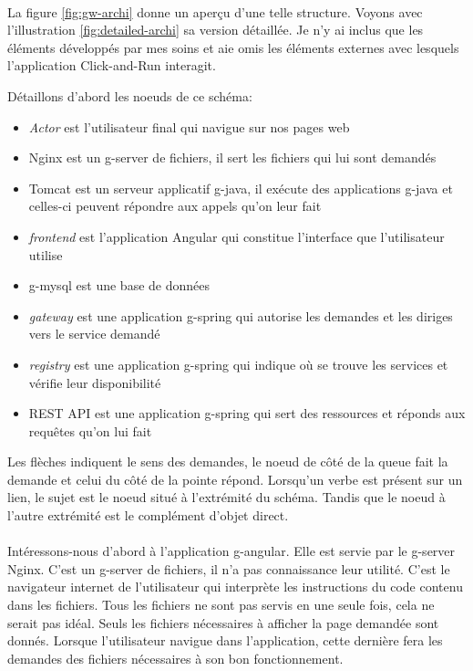 \paragraph{}
La figure \ref{fig:gw-archi} donne un aperçu d'une telle structure.
Voyons avec l'illustration \ref{fig:detailed-archi} sa version détaillée. Je n'y ai inclus que les éléments développés par mes soins et aie omis les éléments externes avec lesquels l'application Click-and-Run interagit.

Détaillons d'abord les noeuds de ce schéma:
\begin{itemize}
    \item \textit{Actor} est l'utilisateur final qui navigue sur nos pages web
    \item Nginx est un \gls{g-server} de fichiers, il sert les fichiers qui lui sont demandés
    \item Tomcat est un serveur applicatif \gls{g-java}, il exécute des applications \gls{g-java} et celles-ci peuvent répondre aux appels qu'on leur fait
    \item \textit{frontend} est l'application Angular qui constitue l'interface que l'utilisateur utilise
    \item \gls{g-mysql} est une base de données
    \item \textit{gateway} est une application \gls{g-spring} qui autorise les demandes et les diriges vers le service demandé
    \item \textit{registry} est une application \gls{g-spring} qui indique où se trouve les services et vérifie leur disponibilité
    \item REST API est une application \gls{g-spring} qui sert des ressources et réponds aux requêtes qu'on lui fait
\end{itemize}
Les flèches indiquent le sens des demandes, le noeud de côté de la queue fait la demande et celui du côté de la pointe répond.
Lorsqu'un verbe est présent sur un lien, le sujet est le noeud situé à l'extrémité du schéma. Tandis que le noeud à l'autre extrémité est le complément d'objet direct.

\paragraph{}
Intéressons-nous d'abord à l'application \gls{g-angular}.
Elle est servie par le \gls{g-server} Nginx.
C'est un \gls{g-server} de fichiers, il n'a pas connaissance leur utilité.
C'est le navigateur internet de l'utilisateur qui interprète les instructions du code contenu dans les fichiers.
Tous les fichiers ne sont pas servis en une seule fois, cela ne serait pas idéal.
Seuls les fichiers nécessaires à afficher la page demandée sont donnés.
Lorsque l'utilisateur navigue dans l'application, cette dernière fera les demandes des fichiers nécessaires à son bon fonctionnement.

